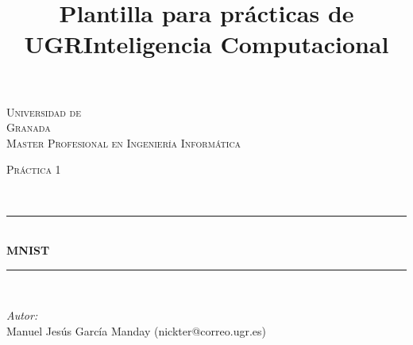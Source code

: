 \documentclass[10pt]{article}
\title{Plantilla para prácticas de UGR}
\title{Inteligencia Computacional}
\begin{document}
\begin{center}																		%
\newcommand{\HRule}{\rule{\linewidth}{0.5mm}}									%
\begin{minipage}{0.48\textwidth} \begin{flushleft}
\end{flushleft}\end{minipage}
\begin{minipage}{0.48\textwidth} \begin{flushright}
\end{flushright}\end{minipage}

\vspace*{-1.5cm}								%
\textsc{\huge Universidad de\\ \vspace{5px} Granada}\\[1.5cm]	

\textsc{\LARGE Master Profesional en Ingenier\'ia Inform\'atica }\\[1.5cm]													%

\begin{minipage}{0.9\textwidth} 
\begin{center}																					%
\textsc{\LARGE Pr\'actica 1}
\end{center}
\end{minipage}\\[0.5cm]
 			\vspace*{1cm}																		%
\HRule \\[0.4cm]																	%
{ \huge \bfseries MNIST}\\[0.4cm]	%
\HRule \\[1.5cm]																	%
\begin{minipage}{0.46\textwidth}													%
\begin{flushleft} \large															%
\emph{Autor:}\\	
Manuel Jes\'us Garc\'ia Manday (nickter@correo.ugr.es)\\
\end{flushleft}																		%
\end{minipage}		
\begin{minipage}{0.52\textwidth}		
\vspace{-0.6cm}											%
\begin{flushright} \large															%
\end{flushright}																	%
\end{minipage}	
\vspace*{1cm}
 	

\end{center}
\end{document}
